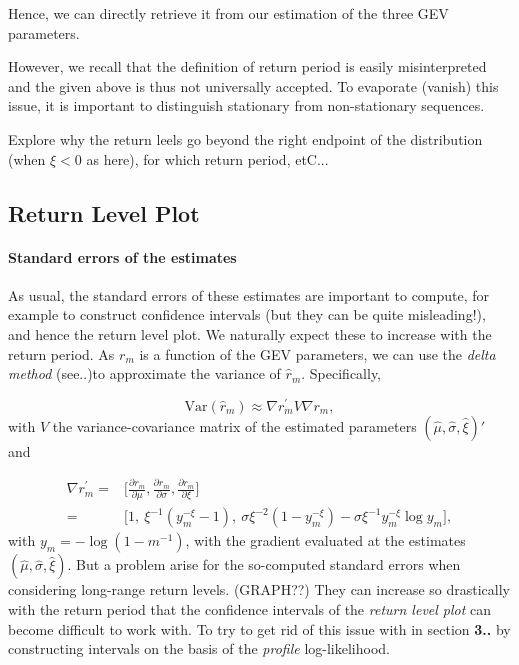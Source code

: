 \documentclass[11pt,a4paper,openany ]{book}
\begin{document}
Hence, we can directly retrieve it from our estimation of the three GEV parameters.

However, we recall that the definition of return period is easily misinterpreted and the given above is thus not universally accepted. %
To evaporate (vanish) this issue, it is important to distinguish stationary from non-stationary sequences.\newline

Explore why the return leels go beyond the right endpoint of the distribution (when $\xi<0$ as here), for which return period, etC...

\subsection{Return Level Plot}\label{rlplot}
\paragraph*{Standard errors of the estimates}As usual, the standard errors of these estimates are important to compute, for example to construct confidence intervals (but they can be quite misleading!), and hence the return level plot. We naturally expect these to increase with the return period.
As $r_m$ is a function of the GEV parameters, we can use the \emph{delta method} (see..)to approximate the variance of $\hat{r}_m$. Specifically,

\begin{equation*}
\text{Var}(\hat{r}_m)\approx\nabla{r^{'}_m}V\nabla{r_m},
\end{equation*}
with $V$ the variance-covariance matrix of the estimated parameters $(\hat{\mu},\hat{\sigma},\hat{\xi})'$ and 

\begin{equation} \label{delta}
\begin{aligned}
\nabla r^{'}_m=
& \Bigg[\frac{\partial r_m}{\partial\mu},\frac{\partial r_m}{\partial\sigma},\frac{\partial r_m}{\partial\xi}\Bigg] \\ 
= & \Big[1,\ \xi^{-1}(y_m^{-\xi}-1),\ \sigma\xi^{-2}(1-y_m^{-\xi})-\sigma\xi^{-1}y_m^{-\xi}\log y_m\Big],
\end{aligned}
\end{equation}
with $y_m=-\log (1-m^{-1})$, with the gradient evaluated at the estimates $(\hat{\mu},\hat{\sigma},\hat{\xi})$.
But a problem arise for the so-computed standard errors when considering long-range return levels. (GRAPH??) They can increase so drastically with the return period that the confidence intervals of the \emph{return level plot} can become difficult to work with. To try to get rid of this issue with in section \textbf{3..} by constructing intervals on the basis of the \emph{profile} log-likelihood. 
\end{document}
